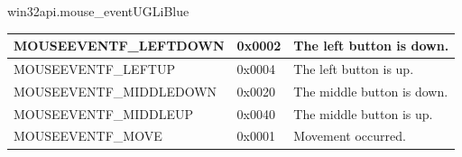 \documentclass[a4paper,10pt,cours,firamath]{nsi}
\begin{document}
\begin{encadrecolore}{win32api.mouse\_event}{UGLiBlue}
\begin{center}
\begin{tabularx}{\textwidth}{|l|l|X|}
			\hline
			MOUSEEVENTF\_LEFTDOWN       & 
			0x0002                      & 
			The left button is down.                                                                                                                                                                                                                                                                                                                                                                                                                                                                                  \\\hline
			MOUSEEVENTF\_LEFTUP         & 
			0x0004                      & 
			The left button is up.                                                                                                                                                                                                                                                                                                                                                                                                                                                                                    \\\hline
			MOUSEEVENTF\_MIDDLEDOWN     & 
			0x0020                      & 
			The middle button is down.                                                                                                                                                                                                                                                                                                                                                                                                                                                                                \\\hline
			MOUSEEVENTF\_MIDDLEUP       & 
			0x0040                      & 
			The middle button is up.                                                                                                                                                                                                                                                                                                                                                                                                                                                                                  \\\hline
			MOUSEEVENTF\_MOVE           & 
			0x0001                      & 
			Movement occurred.                                                                                                                                                                                                                                                                                                                                                                                                                                                                                        \\\hline

\end{tabularx}
\end{center}
\end{encadrecolore}
\end{document}
